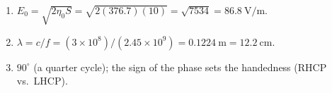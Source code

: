 \begin{enumerate}[leftmargin=1.6em,itemsep=2pt]
\item $E_0 = \sqrt{2\eta_0 S} = \sqrt{2(376.7)(10)} = \sqrt{7534} = 86.8\ \mathrm{V/m}$.
\item $\lambda = c/f = (3\times10^{8})/(2.45\times10^{9}) = 0.1224\ \mathrm{m} = 12.2\ \mathrm{cm}$.
\item $90^{\circ}$ (a quarter cycle); the sign of the phase sets the handedness (RHCP vs.\ LHCP).
\end{enumerate}
